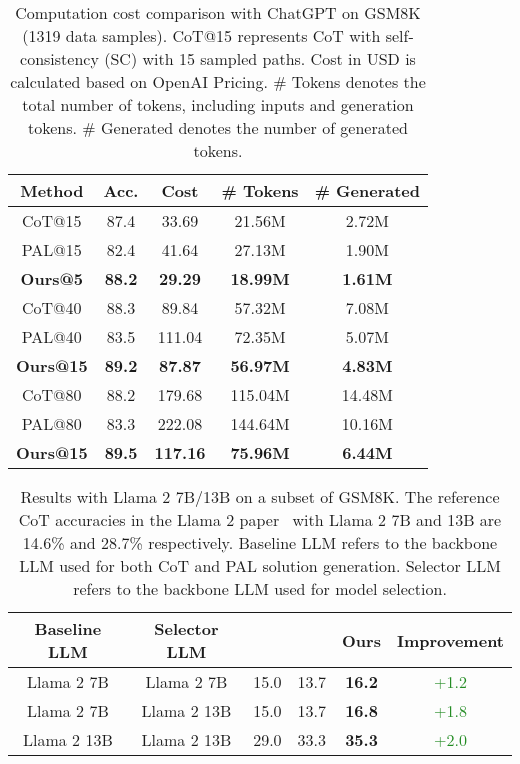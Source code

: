 \documentclass[11pt]{article}
\begin{document}
\begin{table}[t]
    \centering
    \small
    \begin{tabular}{ccccc}
    \toprule
    Method & Acc. & Cost & \# Tokens  & \# Generated \\
     \midrule
     CoT@15 & 87.4 & 33.69 & 21.56M  & 2.72M \\
     PAL@15 & 82.4 & 41.64 & 27.13M & 1.90M \\
     \textbf{Ours@5} & \textbf{88.2} & \textbf{29.29} & \textbf{18.99M}  & \textbf{1.61M} \\
     \midrule
     \midrule
     CoT@40 & 88.3 & 89.84  & 57.32M & 7.08M\\
     PAL@40 & 83.5 & 111.04 & 72.35M & 5.07M\\
    \textbf{Ours@15} & \textbf{89.2} & \textbf{87.87} & \textbf{56.97M}  & \textbf{4.83M} \\
     \midrule
     \midrule
     CoT@80 & 88.2 & 179.68 & 115.04M  & 14.48M\\
     PAL@80 & 83.3 & 222.08 & 144.64M  & 10.16M\\
     \textbf{Ours@15} & \textbf{89.5} & \textbf{117.16} & \textbf{75.96M} & \textbf{6.44M} \\
     \bottomrule
    \end{tabular}
    \caption{Computation cost comparison with ChatGPT on GSM8K (1319 data samples). CoT@15 represents CoT with self-consistency (SC) with 15 sampled paths. Cost in USD is calculated based on OpenAI Pricing\footnotemark. \# Tokens denotes the total number of tokens, including inputs and generation tokens. \# Generated denotes the number of generated tokens. }
    \label{tab:cost_comp}
\end{table}



\begin{table*}[ht]
    \centering
    \small
    \begin{tabular}{cccccc}
    \toprule
    Baseline LLM & Selector LLM &  &  & Ours & Improvement\\
     \midrule
     Llama 2 7B & Llama 2 7B & 15.0 & 13.7  & \textbf{16.2} & \textcolor{ForestGreen}{+1.2}\\
     Llama 2 7B & Llama 2 13B  & 15.0 & 13.7 & \textbf{16.8} & \textcolor{ForestGreen}{+1.8}\\
     Llama 2 13B & Llama 2 13B & 29.0  & 33.3 & \textbf{35.3} &\textcolor{ForestGreen}{+2.0}\\
     \bottomrule
    \end{tabular}
    \caption{Results with Llama 2 7B/13B on a subset of GSM8K. The reference CoT accuracies in the  Llama 2 paper~\citep{Touvron2023Llama2O} with Llama 2 7B and 13B are 14.6\% and 28.7\% respectively. Baseline LLM refers to the backbone LLM used for both CoT and PAL solution generation. Selector LLM refers to the backbone LLM used for model selection.}
    \label{tab:llama2_result}
\end{table*}
\end{document}
